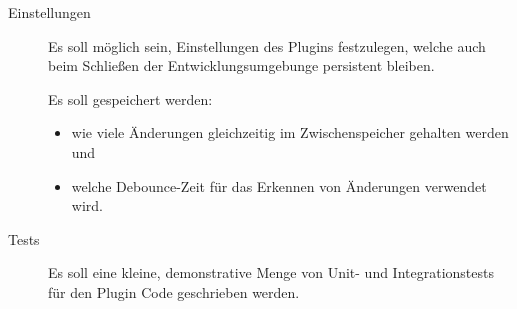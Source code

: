 \begin{description}
    \item[Einstellungen]
    Es soll möglich sein, Einstellungen des Plugins festzulegen, welche
    auch beim Schließen der Entwicklungsumgebunge persistent bleiben.

    Es soll gespeichert werden:
    \begin{itemize}
        \item wie viele Änderungen gleichzeitig im 
            Zwischenspeicher gehalten werden und
        \item welche Debounce-Zeit für das Erkennen 
            von Änderungen verwendet wird. 
    \end{itemize}

    \item[Tests]
    Es soll eine kleine, demonstrative Menge von Unit- und Integrationstests für
    den Plugin Code geschrieben werden.

\end{description}

